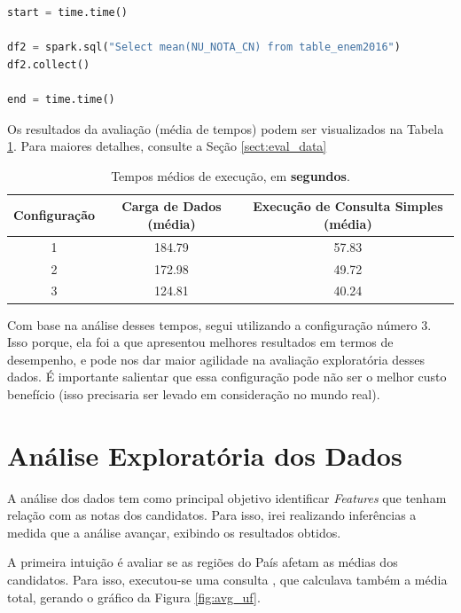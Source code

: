\documentclass{article}
\begin{document}
\begin{lstlisting}[caption= {Consulta Simplificada para Avaliação},captionpos=b, language=python]
start = time.time()

df2 = spark.sql("Select mean(NU_NOTA_CN) from table_enem2016")
df2.collect()

end = time.time()
\end{lstlisting}

Os resultados da avaliação (média de tempos) podem ser visualizados na Tabela \ref{tab:mean_times}. Para maiores detalhes, consulte a Seção \ref{sect:eval_data}

\begin{table}[H]
\centering
\begin{tabular}{|c|c|c|}
\hline
Configuração & Carga de Dados (média) &  Execução de  Consulta Simples (média) \\ \hline 
\hline
1 & 184.79 &  57.83
\\ \hline
2 & 172.98 & 49.72
 \\ \hline
3 & 124.81
 &  40.24
 \\ \hline
\end{tabular}
\caption{Tempos médios de execução, em \textbf{segundos}.}
\label{tab:mean_times}
\end{table}

Com base na análise desses tempos, segui utilizando a configuração número 3. Isso porque, ela foi a que apresentou melhores resultados em termos de desempenho, e pode nos dar maior agilidade na avaliação exploratória desses dados. É importante salientar que essa configuração pode não ser o melhor custo benefício (isso precisaria ser levado em consideração no mundo real).

\newpage
\section{Análise Exploratória dos Dados}

A análise dos dados tem como principal objetivo identificar \emph{Features} que tenham relação com as notas dos candidatos. Para isso, irei realizando inferências a medida que a análise avançar, exibindo os resultados obtidos.

A primeira intuição é avaliar se as regiões do País afetam as médias dos candidatos. Para isso, executou-se uma consulta , que calculava também a média total, gerando o gráfico da Figura \ref{fig:avg_uf}.
\end{document}
